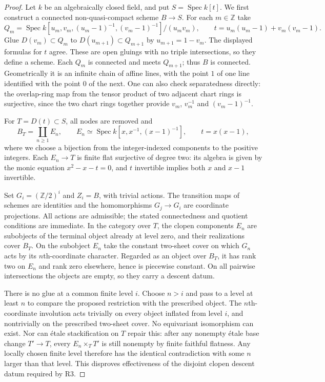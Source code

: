 \begin{proof}
Let $k$ be an algebraically closed field, and put
$S=\operatorname{Spec}k[t]$. We first construct a connected
non-quasi-compact scheme $B\to S$. For each $m\in\mathbb Z$ take
\[
 Q_m=\operatorname{Spec}
 k[u_m,v_m,(u_m-1)^{-1},(v_m-1)^{-1}]/(u_mv_m),
 \qquad t=u_m(u_m-1)+v_m(v_m-1).
\]
Glue $D(v_m)\subset Q_m$ to $D(u_{m+1})\subset Q_{m+1}$ by
$u_{m+1}=1-v_m$. The displayed formulas for $t$ agree. These
are open gluings with no triple intersections, so they define a
scheme. Each $Q_m$ is connected and meets $Q_{m+1}$; thus $B$ is
connected. Geometrically it is an infinite chain of affine lines,
with the point $1$ of one line identified with the point $0$ of the
next. One can also check separatedness directly: the overlap-ring
map from the tensor product of two adjacent chart rings is
surjective, since the two chart rings together provide
$v_m$, $v_m^{-1}$ and $(v_m-1)^{-1}$.

For $T=D(t)\subset S$, all nodes are removed and
\[
 B_T=\coprod_{n\geq1}E_n,
 \qquad E_n\simeq\operatorname{Spec}k[x,x^{-1},(x-1)^{-1}],
 \qquad t=x(x-1),
\]
where we choose a bijection from the integer-indexed components to
the positive integers. Each $E_n\to T$ is finite flat surjective
of degree two: its algebra is given by the monic equation
$x^2-x-t=0$, and $t$ invertible implies both $x$ and $x-1$
invertible.

Set $G_i=(\mathbb Z/2)^i$ and $Z_i=B$, with trivial actions.
The transition maps of schemes are identities and the homomorphisms
$G_j\to G_i$ are coordinate projections. All actions are admissible;
the stated connectedness and quotient conditions are immediate.
In the category over $T$, the clopen components $E_n$ are subobjects
of the terminal object already at level zero, and their realizations
cover $B_T$. On the subobject $E_n$ take the constant two-sheet
cover on which $G_n$ acts by its $n$th-coordinate character.
Regarded as an object over $B_T$, it has rank two on $E_n$ and
rank zero elsewhere, hence is piecewise constant. On all pairwise
intersections the objects are empty, so they carry a descent datum.

There is no glue at a common finite level $i$. Choose $n>i$ and
pass to a level at least $n$ to compare the proposed restriction
with the prescribed object. The $n$th-coordinate involution acts
trivially on every object inflated from level $i$, and nontrivially
on the prescribed two-sheet cover. No equivariant isomorphism can
exist. Nor can \'etale stackification on $T$ repair this: after any
nonempty \'etale base change $T'\to T$, every $E_n\times_TT'$
is still nonempty by finite faithful flatness. Any locally chosen
finite level therefore has the identical contradiction with some
$n$ larger than that level. This disproves effectiveness of the
disjoint clopen descent datum required by R3.


\end{proof}
